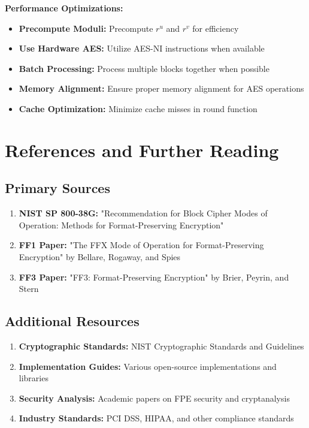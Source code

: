 \documentclass[11pt,a4paper]{article}
\begin{document}
\begin{examplebox}
\textbf{Performance Optimizations:}
\begin{itemize}
    \item \textbf{Precompute Moduli:} Precompute $r^u$ and $r^v$ for efficiency
    \item \textbf{Use Hardware AES:} Utilize AES-NI instructions when available
    \item \textbf{Batch Processing:} Process multiple blocks together when possible
    \item \textbf{Memory Alignment:} Ensure proper memory alignment for AES operations
    \item \textbf{Cache Optimization:} Minimize cache misses in round function
\end{itemize}
\end{examplebox}

\section{References and Further Reading}

\subsection{Primary Sources}

\begin{enumerate}
    \item \textbf{NIST SP 800-38G:} "Recommendation for Block Cipher Modes of Operation: Methods for Format-Preserving Encryption"
    \item \textbf{FF1 Paper:} "The FFX Mode of Operation for Format-Preserving Encryption" by Bellare, Rogaway, and Spies
    \item \textbf{FF3 Paper:} "FF3: Format-Preserving Encryption" by Brier, Peyrin, and Stern
\end{enumerate}

\subsection{Additional Resources}

\begin{enumerate}
    \item \textbf{Cryptographic Standards:} NIST Cryptographic Standards and Guidelines
    \item \textbf{Implementation Guides:} Various open-source implementations and libraries
    \item \textbf{Security Analysis:} Academic papers on FPE security and cryptanalysis
    \item \textbf{Industry Standards:} PCI DSS, HIPAA, and other compliance standards
\end{enumerate}
\end{document}
